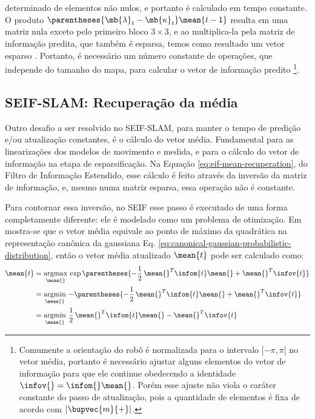 determinado de elementos não nulos, e portanto é calculado em tempo 
constante. O produto $\parentheses{\mb{\lambda}_t - \mb{\kappa}_t}\mean{t-1}$ 
resulta em uma matriz nula exceto pelo primeiro bloco $3\times 3$, e ao 
multiplica-la pela matriz de informação predita, que também é esparsa, 
temos como resultado um vetor esparso 
\cite[p.~398]{bongard2006probabilistic}. Portanto, é necessário um número 
constante de operações, que independe do tamanho do mapa, para calcular o 
vetor de informação predito \footnote{Comumente a orientação do robô é 
normalizada para o intervalo $[-\pi, \pi[$ no vetor média, portanto é necessário 
ajustar alguns elementos do vetor de informação para que ele continue 
obedecendo a identidade $\infov{} = \infom{}\mean{}$. Porém esse ajuste não viola o caráter constante do passo de atualização, pois a quantidade de elementos é fixa de acordo com $\lvert \bupvec{m}{+} \rvert$.}.

\subsection{SEIF-SLAM: Recuperação da média}
\label{sec:seif-mean-recovery}
Outro desafio a ser resolvido no SEIF-SLAM, para manter o tempo de 
predição e/ou atualização constantes, é o cálculo do vetor média. 
Fundamental para as linearizações dos modelos de movimento e medida, e para o cálculo do vetor de informação na etapa de esparsificação. Na Equação 
\ref{eq:eif-mean-recuperation}, do Filtro de Informação Estendido, esse cálculo 
é feito através da inversão da matriz de informação, 
e, mesmo numa matriz esparsa, essa operação não é constante.

Para contornar essa inversão, no SEIF esse passo é executado de uma forma completamente diferente: ele é modelado como um problema de otimização. Em 
\cite[Cap.~12.6]{bongard2006probabilistic} mostra-se que o vetor média equivale 
ao ponto de máximo da quadrática na representação canônica da gaussiana 
Eq. \ref{eq:canonical-gaussian-probabilistic-distribution}, então o 
vetor média atualizado $\mean{t}$ pode ser calculado como:
\begin{equation}
  \begin{aligned}
    \mean{t} &= \mathop{\mathrm{argmax}}\limits_{\mean{}} \,\exp\parentheses{-\frac{1}{2}\,\mean{}^T\infom{t}\mean{} 
    + \mean{}^T \infov{t}}\\
    &= \mathop{\mathrm{argmin}}\limits_{\mean{}}\, - \parentheses{-\frac{1}{2}\,\mean{}^T\infom{t}\mean{} 
    + \mean{}^T \infov{t}}\\
    &= \mathop{\mathrm{argmin}}\limits_{\mean{}}\, \frac{1}{2}\,\mean{}^T\infom{t}\mean{} 
    - \mean{}^T \infov{t}
  \end{aligned}
  \label{eq:seif-mean-recuperation}
\end{equation}

